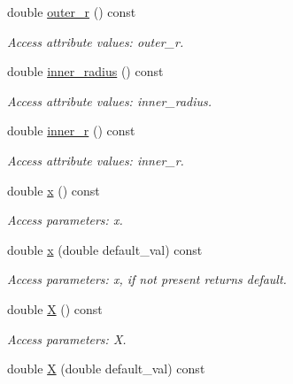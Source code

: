 \begin{DoxyCompactItemize}
double \hyperlink{struct_d_d4hep_1_1_x_m_l_1_1_dimension_ab2348b53888dc3d0e1c9afd956f37a61}{outer\_\-r} () const 
\begin{DoxyCompactList}\small\item\em Access attribute values: outer\_\-r. \item\end{DoxyCompactList}\item 
double \hyperlink{struct_d_d4hep_1_1_x_m_l_1_1_dimension_a640fa0cc5ddafe47591a43beb6fbc52f}{inner\_\-radius} () const 
\begin{DoxyCompactList}\small\item\em Access attribute values: inner\_\-radius. \item\end{DoxyCompactList}\item 
double \hyperlink{struct_d_d4hep_1_1_x_m_l_1_1_dimension_a9e8e55b0f77ab3df95530a376a523a9a}{inner\_\-r} () const 
\begin{DoxyCompactList}\small\item\em Access attribute values: inner\_\-r. \item\end{DoxyCompactList}\item 
double \hyperlink{struct_d_d4hep_1_1_x_m_l_1_1_dimension_a59bb1c7e352d8ca8bc797f1843153cad}{x} () const 
\begin{DoxyCompactList}\small\item\em Access parameters: x. \item\end{DoxyCompactList}\item 
double \hyperlink{struct_d_d4hep_1_1_x_m_l_1_1_dimension_ac383e56cd14f770e71e25258e1f32343}{x} (double default\_\-val) const 
\begin{DoxyCompactList}\small\item\em Access parameters: x, if not present returns default. \item\end{DoxyCompactList}\item 
double \hyperlink{struct_d_d4hep_1_1_x_m_l_1_1_dimension_a883d1190b15a176135065e15140dac06}{X} () const 
\begin{DoxyCompactList}\small\item\em Access parameters: X. \item\end{DoxyCompactList}\item 
double \hyperlink{struct_d_d4hep_1_1_x_m_l_1_1_dimension_a428aa9f251c7af03e08dcb1ebf9b828a}{X} (double default\_\-val) const 

\end{DoxyCompactItemize}
